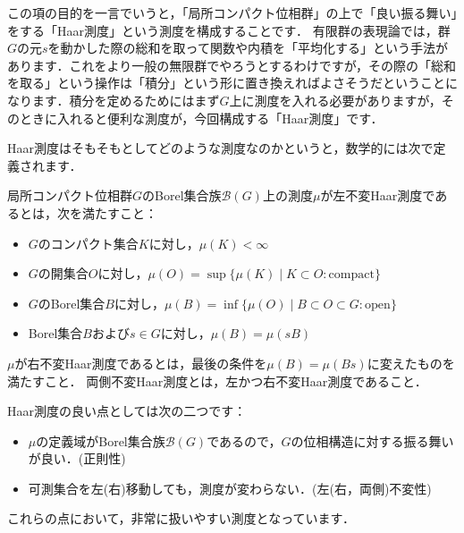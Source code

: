 

この項の目的を一言でいうと，「局所コンパクト位相群」の上で「良い振る舞い」をする「Haar測度」という測度を構成することです．
有限群の表現論では，群$G$の元$s$を動かした際の総和を取って関数や内積を「平均化する」という手法があります．これをより一般の無限群でやろうとするわけですが，その際の「総和を取る」という操作は「積分」という形に置き換えればよさそうだということになります．積分を定めるためにはまず$G$上に測度を入れる必要がありますが，そのときに入れると便利な測度が，今回構成する「Haar測度」です．

Haar測度はそもそもとしてどのような測度なのかというと，数学的には次で定義されます．
\begin{ydefi}[Haar測度]\label{1}
局所コンパクト位相群$G$のBorel集合族$\mathscr{B}(G)$上の測度$\mu$が左不変Haar測度であるとは，次を満たすこと：
\begin{itemize}
 \item $G$のコンパクト集合$K$に対し，$\mu(K) < \infty$
 \item $G$の開集合$O$に対し，$\mu(O)=\sup \{ \mu(K) \mid K \subset O : \mathrm{compact} \}$
 \item $G$のBorel集合$B$に対し，$\mu(B)=\inf \{ \mu(O) \mid B \subset O \subset G : \mathrm{open} \}$
 \item Borel集合$B$および$s \in G$に対し，$\mu (B) = \mu (sB)$
\end{itemize}
$\mu$が右不変Haar測度であるとは，最後の条件を$\mu (B) = \mu (Bs)$に変えたものを満たすこと．
両側不変Haar測度とは，左かつ右不変Haar測度であること．
\end{ydefi}
Haar測度の良い点としては次の二つです：
\begin{itemize}
 \item $\mu$の定義域がBorel集合族$\mathscr{B}(G)$であるので，$G$の位相構造に対する振る舞いが良い．(正則性)
 \item 可測集合を左(右)移動しても，測度が変わらない．(左(右，両側)不変性)
\end{itemize}
これらの点において，非常に扱いやすい測度となっています．

